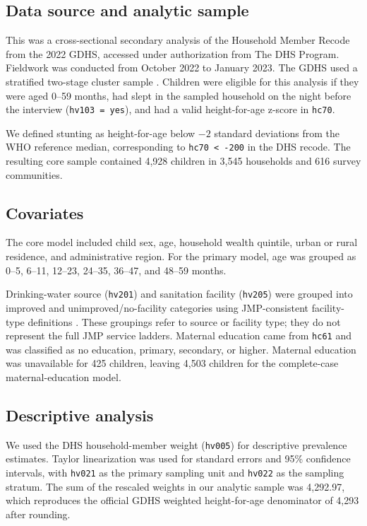 \documentclass[11pt]{article}
\begin{document}
\subsection{Data source and analytic sample}

This was a cross-sectional secondary analysis of the Household Member Recode from the 2022 GDHS, accessed under authorization from The DHS Program. Fieldwork was conducted from October 2022 to January 2023. The GDHS used a stratified two-stage cluster sample \citep{GSSICF2024}. Children were eligible for this analysis if they were aged 0--59 months, had slept in the sampled household on the night before the interview (\texttt{hv103 = yes}), and had a valid height-for-age z-score in \texttt{hc70}.

We defined stunting as height-for-age below $-2$ standard deviations from the WHO reference median, corresponding to \texttt{hc70 < -200} in the DHS recode. The resulting core sample contained 4,928 children in 3,545 households and 616 survey communities.

\subsection{Covariates}

The core model included child sex, age, household wealth quintile, urban or rural residence, and administrative region. For the primary model, age was grouped as 0--5, 6--11, 12--23, 24--35, 36--47, and 48--59 months.

Drinking-water source (\texttt{hv201}) and sanitation facility (\texttt{hv205}) were grouped into improved and unimproved/no-facility categories using JMP-consistent facility-type definitions \citep{WHOUNICEFJMP2021}. These groupings refer to source or facility type; they do not represent the full JMP service ladders. Maternal education came from \texttt{hc61} and was classified as no education, primary, secondary, or higher. Maternal education was unavailable for 425 children, leaving 4,503 children for the complete-case maternal-education model.

\subsection{Descriptive analysis}

We used the DHS household-member weight (\texttt{hv005}) for descriptive prevalence estimates. Taylor linearization was used for standard errors and 95\% confidence intervals, with \texttt{hv021} as the primary sampling unit and \texttt{hv022} as the sampling stratum. The sum of the rescaled weights in our analytic sample was 4,292.97, which reproduces the official GDHS weighted height-for-age denominator of 4,293 after rounding.
\end{document}
